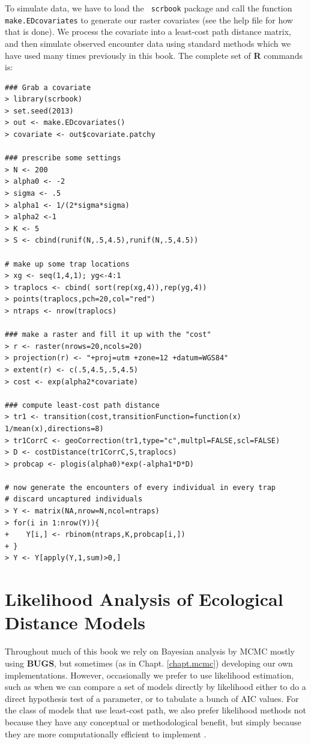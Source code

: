 To simulate data,
 we have to load the \mbox{\tt
scrbook} package and call the function \mbox{\tt make.EDcovariates} to generate
our raster covariates (see the help file for how that is done). We
process the covariate into a least-cost path distance
matrix, and then simulate observed encounter data using standard methods
which we have used many times previously in this book. The complete set
of {\bf R} commands is:
{\small
\begin{verbatim}
### Grab a covariate
> library(scrbook)
> set.seed(2013)
> out <- make.EDcovariates()
> covariate <- out$covariate.patchy

### prescribe some settings
> N <- 200
> alpha0 <- -2
> sigma <- .5
> alpha1 <- 1/(2*sigma*sigma)
> alpha2 <-1
> K <- 5
> S <- cbind(runif(N,.5,4.5),runif(N,.5,4.5))

# make up some trap locations
> xg <- seq(1,4,1); yg<-4:1
> traplocs <- cbind( sort(rep(xg,4)),rep(yg,4))
> points(traplocs,pch=20,col="red")
> ntraps <- nrow(traplocs)

### make a raster and fill it up with the "cost"
> r <- raster(nrows=20,ncols=20)
> projection(r) <- "+proj=utm +zone=12 +datum=WGS84"
> extent(r) <- c(.5,4.5,.5,4.5)
> cost <- exp(alpha2*covariate)

### compute least-cost path distance
> tr1 <- transition(cost,transitionFunction=function(x) 1/mean(x),directions=8)
> tr1CorrC <- geoCorrection(tr1,type="c",multpl=FALSE,scl=FALSE)
> D <- costDistance(tr1CorrC,S,traplocs)
> probcap <- plogis(alpha0)*exp(-alpha1*D*D)

# now generate the encounters of every individual in every trap
# discard uncaptured individuals
> Y <- matrix(NA,nrow=N,ncol=ntraps)
> for(i in 1:nrow(Y)){
+    Y[i,] <- rbinom(ntraps,K,probcap[i,])
+ }
> Y <- Y[apply(Y,1,sum)>0,]
\end{verbatim}
}


\section{Likelihood Analysis of Ecological Distance Models}
\label{ecoldist.sec.mle}

Throughout much of this book we rely on Bayesian analysis by MCMC
mostly using {\bf BUGS}, but sometimes (as in Chapt. \ref{chapt.mcmc})
developing our own implementations. However, occasionally we prefer to
use likelihood estimation, such as when we can compare a set of models
directly by likelihood either to do a direct hypothesis test of a
parameter, or to tabulate a bunch of AIC values. For the class of
models that use least-cost path, we also prefer likelihood methods not
because they have any conceptual or methodological benefit, but simply
because they are more computationally efficient to implement
\citep{royle_etal:2012ecol}.

